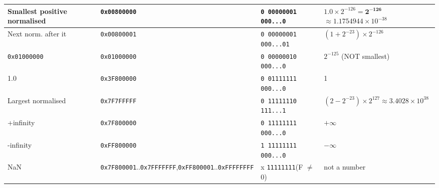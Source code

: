 \documentclass[10pt, portrait]{article}
\begin{document}
\begin{multicols*}{2}
\begin{center}
{\begin{tabular}{|p{1.8cm}|p{1.9cm}|p{2.1cm}|p{2.9cm}|}
    Smallest positive \textbf{normalised} & \texttt{0x00800000} & \texttt{0 00000001\newline 000...0} & $1.0 \times 2^{-126} = \mathbf{2^{-126}}$\newline $\approx 1.1754944 \times 10^{-38}$ \\ \hline
    Next norm. after it & \texttt{0x00800001} & \texttt{0 00000001\newline 000...01} & $(1 + 2^{-23}) \times 2^{-126}$ \\ \hline
    \texttt{0x01000000} & \texttt{0x01000000} & \texttt{0 00000010\newline 000...0} & $2^{-125}$ (NOT smallest) \\ \hline
    1.0 & \texttt{0x3F800000} & \texttt{0 01111111\newline 000...0} & 1 \\ \hline
    Largest normalised & \texttt{0x7F7FFFFF} & \texttt{0 11111110\newline 111...1} & $(2 - 2^{-23}) \times 2^{127}$\newline $\approx 3.4028 \times 10^{38}$ \\ \hline
    +infinity & \texttt{0x7F800000} & \texttt{0 11111111\newline 000...0} & $+\infty$ \\ \hline
    -infinity & \texttt{0xFF800000} & \texttt{1 11111111\newline 000...0} & $-\infty$ \\ \hline
    NaN & \texttt{0x7F800001}..\newline\texttt{0x7FFFFFFF},\newline \texttt{0xFF800001}..\newline\texttt{0xFFFFFFFF} & x \texttt{11111111}\newline (F $\neq$ 0) & not a number \\ \hline
    \end{tabular}%
    }
    \endgroup
\end{center}


\end{multicols*}
\end{document}
